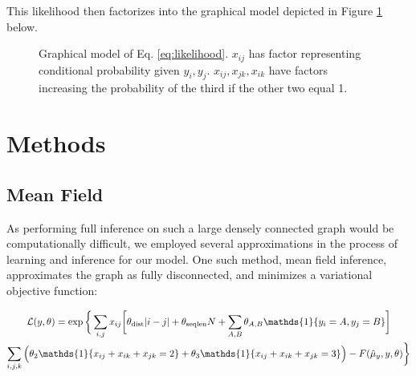 \documentclass{article}
\begin{document}
This likelihood then factorizes into the graphical model depicted in Figure \ref{fig:model} below.
\begin{figure}
\centering
{}
\caption{Graphical model of Eq. \ref{eq:likelihood}. $x_{ij}$ has factor representing conditional probability given $y_i, y_j$. $x_{ij}, x_{jk}, x_{ik}$ have factors increasing the probability of the third if the other two equal 1.}
\label{fig:model}
\end{figure}

\section{Methods}
\subsection{Mean Field}
As performing full inference on such a large densely connected graph would be computationally difficult, we employed several approximations in the process of learning and inference for our model. One such method, mean field inference, approximates the graph as fully disconnected, and minimizes a variational objective function:

\begin{multline} \label{eq:mflikelihood}
\mathcal{L}(y, \theta) = \exp\bigg\{\sum_{i, j} x_{ij}\bigg[\theta_{\textmd{dist}}|i - j|+ \theta_{\textmd{seqlen}}N + \sum_{A, B} \theta_{A, B}\mathds{1}\{y_i = A, y_j = B\}\bigg] \\
\sum_{i, j, k}\Big(\theta_2\mathds{1}\{x_{ij} + x_{ik} + x_{jk} = 2\} + \theta_3\mathds{1}\{x_{ij} + x_{ik} + x_{jk} = 3\}\Big)  - F(\hat{\mu}_{y}, y, \theta) \bigg\}
\end{multline}
\end{document}
